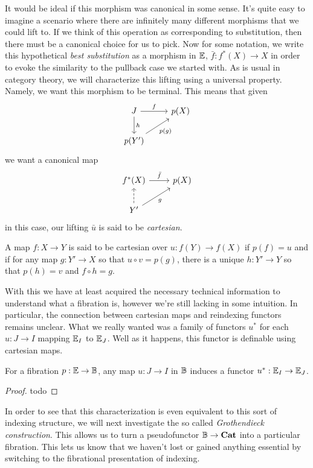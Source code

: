 It would be ideal if this morphism was canonical in some sense. It's
quite easy to imagine a scenario where there are infinitely many
different morphisms that we could lift to. If we think of this
operation as corresponding to substitution, then there must be a
canonical choice for us to pick. Now for some notation, we write this
hypothetical \emph{best substitution} as a morphism in $\mathbb{E}$,
$\bar{f} : f^*(X) \to X$ in order to evoke the similarity to the
pullback case we started with. As is usual in category theory, we will
characterize this lifting using a universal property. Namely, we want
this morphism to be terminal. This means that given
\[
  \begin{tikzcd}
    J \ar[r, "f"] \ar[d, "h"] & p(X)\\
    p(Y') \ar[ru, "p(g)", swap]
  \end{tikzcd}
\]
we want a canonical map
\[
  \begin{tikzcd}
    f^*(X) \ar[r, "\bar{f}"] & p(X)\\
    Y' \ar[u, dashed] \ar[ru, "g", swap]
  \end{tikzcd}
\]
in this case, our lifting $\bar{u}$ is said to be \emph{cartesian}.
\begin{defn}\label{defn:fibrations:cartesian}
  A map $f : X \to Y$ is said to be cartesian over $u : f(Y) \to f(X)$
  if $p(f) = u$ and if for any map $g : Y' \to X$ so that
  $u \circ v = p(g)$, there is a unique $h : Y' \to Y$ so that
  $p(h) = v$ and $f \circ h = g$.
\end{defn}

With this we have at least acquired the necessary technical
information to understand what a fibration is, however we're still
lacking in some intuition. In particular, the connection between
cartesian maps and reindexing functors remains unclear. What we really
wanted was a family of functors $u^*$ for each $u : J \to I$ mapping
$\mathbb{E}_I$ to $\mathbb{E}_J$. Well as it happens, this functor is definable
using cartesian maps.

\begin{thm}\label{thm:fibrations:reindexing}
  For a fibration $p : \mathbb{E} \to \mathbb{B}$, any map $u : J \to I$ in
  $\mathbb{B}$ induces a functor $u^* : \mathbb{E}_I \to \mathbb{E}_J$.
\end{thm}
\begin{proof}
  todo
\end{proof}

In order to see that this characterization is even equivalent to this
sort of indexing structure, we will next investigate the so called
\emph{Grothendieck construction}. This allows us to turn a
pseudofunctor $\mathbb{B} \to \mathbf{Cat}$ into a particular fibration. This
lets us know that we haven't lost or gained anything essential by
switching to the fibrational presentation of indexing.

